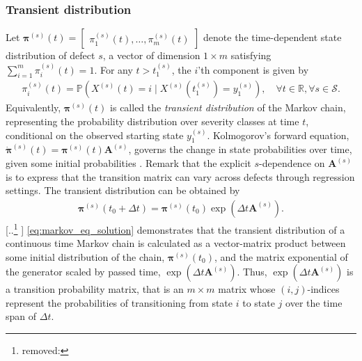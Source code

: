 \documentclass{article}
\providecommand{\DIFadd}[1]{{\protect\color{blue} \sf #1}} %
\providecommand{\DIFdel}[1]{{\protect\color{red} [..\footnote{removed: #1} ]}} %
\providecommand{\DIFaddbegin}{} %
\providecommand{\DIFaddend}{} %
\providecommand{\DIFdelbegin}{} %
\providecommand{\DIFdelend}{} %
\begin{document}
\DIFaddbegin \subsubsection{\DIFadd{Transient distribution}} \label{sec:transient_dist}
\DIFaddend Let $\bm{\pi}^{(s)}(t) = \begin{bmatrix} \pi^{(s)}_1(t), \dots, \pi^{(s)}_m(t) \end{bmatrix}$ denote the time-dependent state distribution of defect $s$, a vector of dimension $1 \times m$ satisfying $\sum_{i = 1}^m \pi^{(s)}_i(t) = 1$. For any $t>t_1^{(s)}$, the $i$'th component is given by
\begin{align}
\pi_i^{(s)}(t) = \mathds{P} \left( X^{(s)}(t) = i \mid X^{(s)}(t_1^{(s)}) = y_1^{(s)}  \right), \quad \forall t\in \mathbb{R}, \forall s \in \mathcal{S}. \label{eq:transient_dist} 
\end{align}
Equivalently, $\bm{\pi}^{(s)}(t)$ is called the \textit{transient distribution} of the Markov chain, representing the probability distribution over severity classes at time $t$, conditional on the observed starting state $y_1^{(s)}$.
Kolmogorov's forward equation, $\Dot{\bm{\pi}}^{(s)}(t) = \bm{\pi}^{(s)}(t) \bm{A}^{(s)}$, governs the change in state probabilities over time, given some initial probabilities \citep[Section 1.3]{bladt_nielsen}. \DIFaddbegin \DIFadd{Remark that the explicit $s$-dependence on $\bm{A}^{(s)}$ is to express that the transition matrix can vary across defects through regression settings.
}\DIFaddend The transient distribution can be obtained by
\DIFdelbegin %
\DIFdelend \DIFaddbegin \begin{equation}
\begin{aligned}
                  \bm{\pi}^{(s)}(t_0 + \Delta t) = 
                  \bm{\pi}^{(s)}(t_0) \exp{ ( \Delta t \bm{A}^{(s)} ) }. \label{eq:markov_eq_solution} %
\end{aligned}     
\end{equation}\DIFaddend 
\DIFdelbegin \DIFdel{ }\DIFdelend \DIFaddbegin \DIFadd{\cref{eq:markov_eq_solution} }\DIFaddend demonstrates that the transient distribution of a continuous time Markov chain is calculated as a vector-matrix product between some initial distribution of the chain, $\bm{\pi}^{(s)}(t_0)$, and the matrix exponential of the generator scaled by passed time, $\exp{ ( \Delta t \bm{A}^{(s)} ) }$. Thus, $\exp{ ( \Delta t \bm{A}^{(s)} ) }$ is a transition probability matrix, that is an $m \times m$ matrix whose $(i,j)$-indices represent the probabilities of transitioning from state $i$ to state $j$ over the time span of $\Delta t$.
\end{document}
